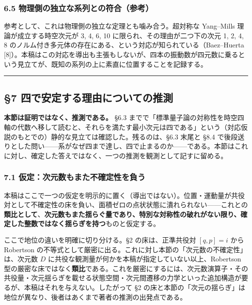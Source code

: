 \documentclass[
]{ltjsarticle}
\begin{document}
\subsubsection{6.5
物理側の独立な系列との符合（参考）}\label{ux7269ux7406ux5074ux306eux72ecux7acbux306aux7cfbux5217ux3068ux306eux7b26ux5408ux53c2ux8003}

参考として、これは物理側の独立な定理とも噛み合う。超対称な Yang--Mills
理論が成立する時空次元が 3, 4, 6, 10 に限られ、その理由が二つ下の次元 1,
2, 4, 8
のノルム付き多元体の存在にある、という対応が知られている（Baez--Huerta
{[}8{]}）。本稿はこの対応を導出も主張もしないが、四本の振動数が四元数に乗るという見立てが、既知の系列の上に素直に位置することを記録する。

\begin{center}\rule{0.5\linewidth}{0.5pt}\end{center}

\subsection{§7
四で安定する理由についての推測}\label{ux56dbux3067ux5b89ux5b9aux3059ux308bux7406ux7531ux306bux3064ux3044ux3066ux306eux63a8ux6e2c}

\textbf{本節は証明ではなく、推測である。} §6.3
までで「標準量子論の対称性を時空四軸の代数へ移して読むと、それらを満たす最小次元は四である」という（対応仮説のもとでの）静的な見立ては確認した。残るのは、§6.3
末尾と §8.4
で後段送りとした問い------系がなぜ四まで達し、四で止まるのか------である。本節はこれに対し、確定した答えではなく、一つの推測を観測として記すに留める。

\subsubsection{7.1
仮定：次元数もまた不確定性を負う}\label{ux4eeeux5b9aux6b21ux5143ux6570ux3082ux307eux305fux4e0dux78baux5b9aux6027ux3092ux8ca0ux3046}

本稿はここで一つの仮定を明示的に置く（導出ではない）。位置・運動量が共役対として不確定性の床を負い、面積ゼロの点状状態に潰れられない------これとの\textbf{類比として}、\textbf{次元数もまた揺らぐ量であり、特別な対称性の破れがない限り、確定した整数ではなく揺らぎを持つ}ものと仮定する。

ここで地位の違いを明確に切り分ける。§2 の床は、正準共役対 \([q,p]=i\)
から Robertson
の不等式として厳密に出る。これに対し本節の「次元数の不確定性」は、次元数
\(D\) に共役な観測量が何かを本稿が指定していない以上、Robertson
型の厳密な床ではなく\textbf{類比}である。これを厳密にするには、次元数演算子・その共役量・次元揺らぎを載せる状態空間・次元間遷移の力学といった追加構造が要るが、本稿はそれを与えない。したがって
§2
の床と本節の「次元の揺らぎ」は地位が異なり、後者はあくまで著者の推測の出発点である。
\end{document}
